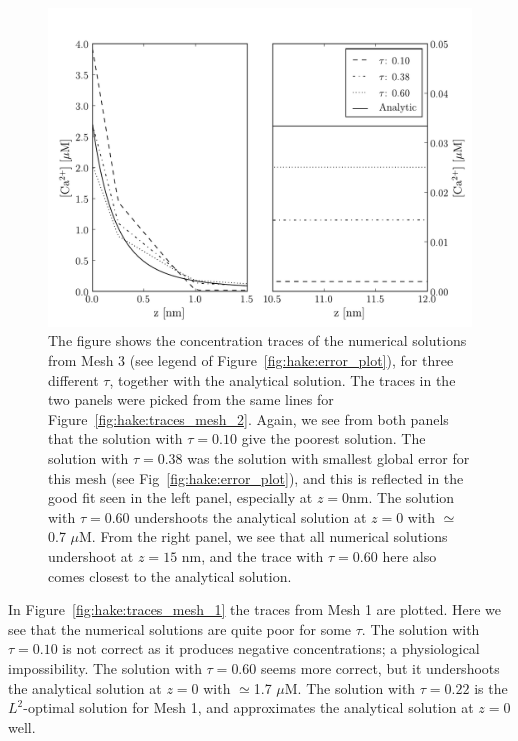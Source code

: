 \begin{figure}
  \centering
  \includegraphics[width=\largefig]{chapters/hake/pdf/traces_mesh_3}
  \caption[Concentration traces 3]{The figure shows the
    concentration traces of the numerical solutions from Mesh 3 (see
    legend of Figure~\ref{fig:hake:error_plot}), for three different
    $\tau$, together with the analytical solution. The traces in the
    two panels were picked from the same lines for
    Figure~\ref{fig:hake:traces_mesh_2}. Again, we see from both
    panels that the solution with $\tau=0.10$ give the poorest
    solution. The solution with $\tau=0.38$ was the solution with
    smallest global error for this mesh (see
    Fig~\ref{fig:hake:error_plot}), and this is reflected in the
    good fit seen in the left panel, especially at $z=0$nm. The
    solution with $\tau=0.60$ undershoots the analytical solution at
    $z=0$ with $\simeq$0.7 $\mu$M. From the right panel, we see that
    all numerical solutions undershoot at $z=15$ nm, and the trace
    with $\tau=0.60$ here also comes closest to the analytical
    solution.}
  \label{fig:hake:traces_mesh_3}
\end{figure}

In Figure~\ref{fig:hake:traces_mesh_1} the traces from Mesh 1 are
plotted. Here we see that the numerical solutions are quite poor for
some $\tau$. The solution with $\tau=0.10$ is not correct as it
produces negative concentrations; a physiological impossibility. The
solution with $\tau=0.60$ seems more correct, but it undershoots the
analytical solution at $z=0$ with $\simeq$1.7 $\mu$M. The solution with
$\tau=0.22$ is the $L^2$-optimal solution for Mesh 1, and approximates
the analytical solution at $z=0$ well.

